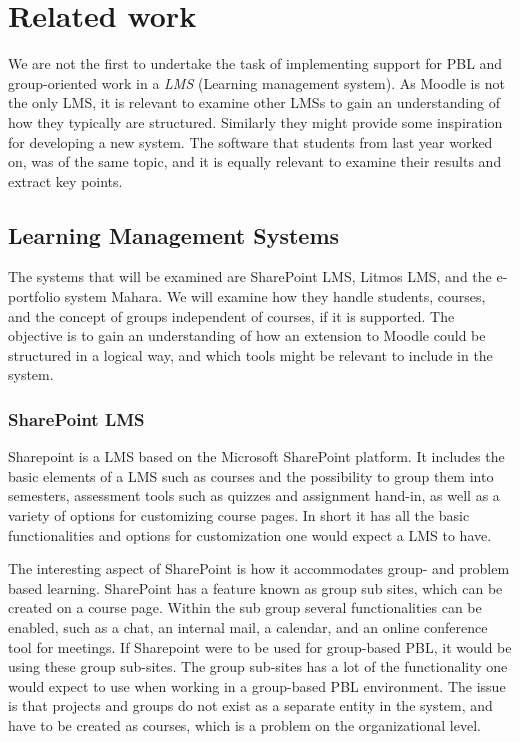 \section{Related work}
We are not the first to undertake the task of implementing support for PBL and group-oriented work in a \textit{LMS} (Learning management system). 
As Moodle is not the only LMS, it is relevant to examine other LMSs to gain an understanding of how they typically are structured. 
Similarly they might provide some inspiration for developing a new system.
The software that students from last year worked on, was of the same topic, and it is equally relevant to examine their results and extract key points.

\subsection{Learning Management Systems}
The systems that will be examined are SharePoint LMS, Litmos LMS, and the e-portfolio system Mahara.
We will examine how they handle students, courses, and the concept of groups independent of courses, if it is supported.
The objective is to gain an understanding of how an extension to Moodle could be structured in a logical way, and which tools might be relevant to include in the system.

\subsubsection{SharePoint LMS}
Sharepoint \citep{sharepoint1,sharepoint2} is a LMS based on the Microsoft SharePoint platform. 
It includes the basic elements of a LMS such as courses and the possibility to group them into semesters, assessment tools such as quizzes and assignment hand-in, as well as a variety of options for customizing course pages.
In short it has all the basic functionalities and options for customization one would expect a LMS to have.

The interesting aspect of SharePoint is how it accommodates group- and problem based learning. 
SharePoint has a feature known as group sub sites, which can be created on a course page.
Within the sub group several functionalities can be enabled, such as a chat, an internal mail, a calendar, and an online conference tool for meetings.
If Sharepoint were to be used for group-based PBL, it would be using these group sub-sites.
The group sub-sites has a lot of the functionality one would expect to use when working in a group-based PBL environment.
The issue is that projects and groups do not exist as a separate entity in the system, and have to be created as courses, which is a problem on the organizational level.


